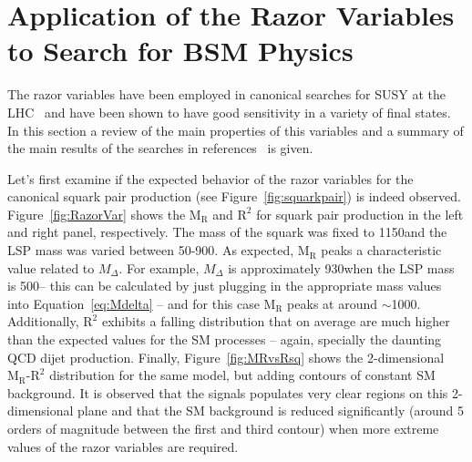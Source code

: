 \section{Application of the Razor Variables to Search for BSM Physics}\label{razorApp}

The razor variables have been employed in canonical searches for SUSY
at the LHC~\cite{razor2010,Razor8TeV,Razor13TeV} and have been shown to have good sensitivity in a variety
of final states. In this section a review of the main properties of
this variables and a summary of the main results of the searches in
references~\cite{razor2010,Razor8TeV,Razor13TeV} is given.

Let's first examine if the expected behavior of the razor variables
for the canonical squark pair production (see
Figure~\ref{fig:squarkpair}) is indeed
observed. Figure~\ref{fig:RazorVar} shows the $\mathrm{M_{R}}$ and
$\mathrm{R^{2}}$ for squark pair production in the left and right
panel, respectively. The mass of the squark was fixed to 1150\GeV and
the LSP mass was varied between 50-900\GeV. As expected,
$\mathrm{M_{R}}$ peaks a characteristic value related to
$M_{\Delta}$. For example, $M_{\Delta}$ is approximately 930\GeV when the LSP
mass is 500\GeV -- this can be calculated by just plugging in the appropriate mass values
into Equation~\ref{eq:Mdelta} -- and for this case $\mathrm{M_{R}}$ peaks at around
$\sim$1000\GeV. Additionally, $\mathrm{R^{2}}$ exhibits a falling
distribution that on average are much higher than the expected values
for the SM processes -- again, specially the daunting QCD dijet
production. Finally, Figure~\ref{fig:MRvsRsq} shows the 2-dimensional
$\mathrm{M_{R}}$-$\mathrm{R^{2}}$ distribution for the same model, but
adding contours of constant SM background. It is observed that the
signals populates very clear regions on this 2-dimensional plane and
that the SM background is reduced significantly (around 5 orders of
magnitude between the first and third contour) when more extreme
values of the razor variables are required.
